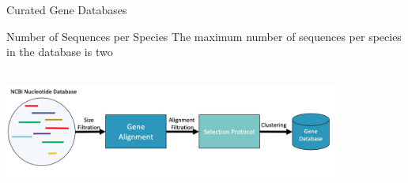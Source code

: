 \documentclass[11pt]{beamer}
\begin{document}
  \begin{frame}{Curated Gene Databases}
  \begin{block}{Number of Sequences per Species}
  The maximum number of sequences per species in the database is two
  \end{block}
  \center
  \includegraphics[height=4cm, width=11cm]{CPBS_11_18/Gene_Database_Workflow.jpg}
  \end{frame}
\end{document}
